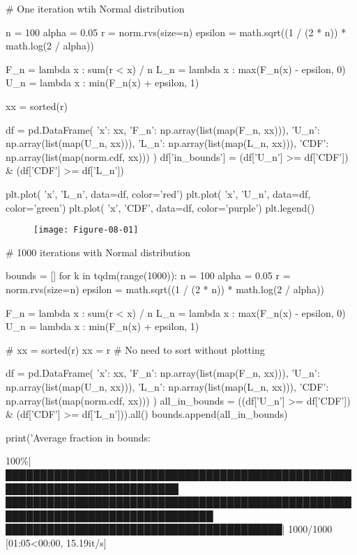 \begin{python}
# One iteration wtih Normal distribution

n = 100
alpha = 0.05
r = norm.rvs(size=n)
epsilon = math.sqrt((1 / (2 * n)) * math.log(2 / alpha))

F_n = lambda x : sum(r < x) / n
L_n = lambda x : max(F_n(x) - epsilon, 0)
U_n = lambda x : min(F_n(x) + epsilon, 1)

xx = sorted(r)

df = pd.DataFrame({
    'x': xx, 
    'F_n': np.array(list(map(F_n, xx))), 
    'U_n': np.array(list(map(U_n, xx))), 
    'L_n': np.array(list(map(L_n, xx))), 
    'CDF': np.array(list(map(norm.cdf, xx)))
})
df['in_bounds'] = (df['U_n'] >= df['CDF']) & (df['CDF'] >= df['L_n'])

plt.plot( 'x', 'L_n', data=df, color='red')
plt.plot( 'x', 'U_n', data=df, color='green')
plt.plot( 'x', 'CDF', data=df, color='purple')
plt.legend()
\end{python}

\begin{figure}[H]
\texttt{[image: Figure-08-01]}
\end{figure}
    
\begin{python}
# 1000 iterations with Normal distribution

bounds = []
for k in tqdm(range(1000)):
    n = 100
    alpha = 0.05
    r = norm.rvs(size=n)
    epsilon = math.sqrt((1 / (2 * n)) * math.log(2 / alpha))

    F_n = lambda x : sum(r < x) / n
    L_n = lambda x : max(F_n(x) - epsilon, 0)
    U_n = lambda x : min(F_n(x) + epsilon, 1)

    # xx = sorted(r)
    xx = r # No need to sort without plotting
    
    df = pd.DataFrame({
        'x': xx, 
        'F_n': np.array(list(map(F_n, xx))), 
        'U_n': np.array(list(map(U_n, xx))), 
        'L_n': np.array(list(map(L_n, xx))), 
        'CDF': np.array(list(map(norm.cdf, xx)))
    })
    all_in_bounds = ((df['U_n'] >= df['CDF']) & (df['CDF'] >= df['L_n'])).all()
    bounds.append(all_in_bounds)
    
print('Average fraction in bounds: %
\end{python}

\begin{console}
100\%|███████████████████████████████████████████████████████████████████████████
████████████████████████████████████████████████████████████████████████████████
████████████████████████████████████████| 1000/1000 [01:05<00:00, 15.19it/s]
\end{console}

